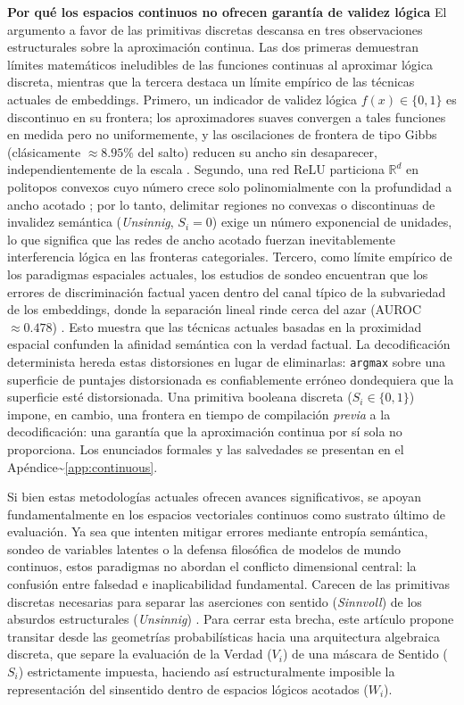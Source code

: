 \documentclass{article}
\begin{document}
\textbf{Por qué los espacios continuos no ofrecen garantía de validez
lógica} El argumento a favor de las primitivas discretas descansa en
tres observaciones estructurales sobre la aproximación continua. Las dos
primeras demuestran límites matemáticos ineludibles de las funciones
continuas al aproximar lógica discreta, mientras que la tercera destaca
un límite empírico de las técnicas actuales de embeddings. Primero, un
indicador de validez lógica \(f(x) \in \{0, 1\}\) es discontinuo en su
frontera; los aproximadores suaves convergen a tales funciones en medida
pero no uniformemente, y las oscilaciones de frontera de tipo Gibbs
(clásicamente \(\approx 8.95\%\) del salto) reducen su ancho sin
desaparecer, independientemente de la escala
\citep{hornik1991approximation}. Segundo, una red ReLU particiona
\(\mathbb{R}^d\) en politopos convexos cuyo número crece solo
polinomialmente con la profundidad a ancho acotado
\citep{hanin2017universal}; por lo tanto, delimitar regiones no convexas
o discontinuas de invalidez semántica (\emph{Unsinnig}, \(S_i = 0\))
exige un número exponencial de unidades, lo que significa que las redes
de ancho acotado fuerzan inevitablemente interferencia lógica en las
fronteras categoriales. Tercero, como límite empírico de los paradigmas
espaciales actuales, los estudios de sondeo encuentran que los errores
de discriminación factual yacen dentro del canal típico de la
subvariedad de los embeddings, donde la separación lineal rinde cerca
del azar (AUROC \(\approx 0.478\)) \citep{wei2024measuring}. Esto
muestra que las técnicas actuales basadas en la proximidad espacial
confunden la afinidad semántica con la verdad factual. La decodificación
determinista hereda estas distorsiones en lugar de eliminarlas:
\texttt{argmax} sobre una superficie de puntajes distorsionada es
confiablemente erróneo dondequiera que la superficie esté distorsionada.
Una primitiva booleana discreta (\(S_i \in \{0, 1\}\)) impone, en
cambio, una frontera en tiempo de compilación \emph{previa} a la
decodificación: una garantía que la aproximación continua por sí sola no
proporciona. Los enunciados formales y las salvedades se presentan en el
Apéndice\textasciitilde{}\ref{app:continuous}.

Si bien estas metodologías actuales ofrecen avances significativos, se
apoyan fundamentalmente en los espacios vectoriales continuos como
sustrato último de evaluación. Ya sea que intenten mitigar errores
mediante entropía semántica, sondeo de variables latentes o la defensa
filosófica de modelos de mundo continuos, estos paradigmas no abordan el
conflicto dimensional central: la confusión entre falsedad e
inaplicabilidad fundamental. Carecen de las primitivas discretas
necesarias para separar las aserciones con sentido (\emph{Sinnvoll}) de
los absurdos estructurales (\emph{Unsinnig}) \citep{wittgenstein1922}.
Para cerrar esta brecha, este artículo propone transitar desde las
geometrías probabilísticas hacia una arquitectura algebraica discreta,
que separe la evaluación de la Verdad (\(V_i\)) de una máscara de
Sentido (\(S_i\)) estrictamente impuesta, haciendo así estructuralmente
imposible la representación del sinsentido dentro de espacios lógicos
acotados (\(W_i\)).
\end{document}

